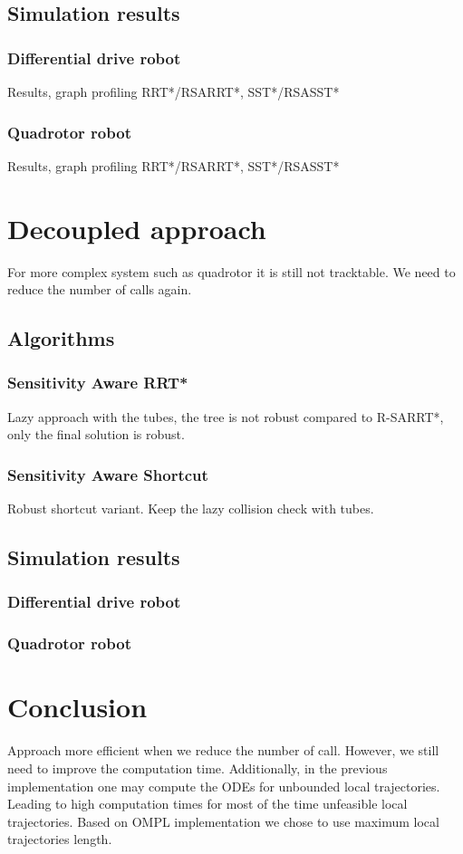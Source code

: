 \subsection{Simulation results}
\subsubsection{Differential drive robot}
Results, graph profiling RRT*/RSARRT*, SST*/RSASST*
\subsubsection{Quadrotor robot}
Results, graph profiling RRT*/RSARRT*, SST*/RSASST*

\section{Decoupled approach}
For more complex system such as quadrotor it is still not tracktable. We need to reduce the number of calls again.
\subsection{Algorithms}
\subsubsection{Sensitivity Aware RRT*}
Lazy approach with the tubes, the tree is not robust compared to R-SARRT*, only the final solution is robust.
\subsubsection{Sensitivity Aware Shortcut}
Robust shortcut variant.
Keep the lazy collision check with tubes.

\subsection{Simulation results}
\subsubsection{Differential drive robot}
\subsubsection{Quadrotor robot}

\section{Conclusion}
Approach more efficient when we reduce the number of call. 
However, we still need to improve the computation time.
Additionally, in the previous implementation one may compute the ODEs for unbounded local trajectories. 
Leading to high computation times for most of the time unfeasible local trajectories. Based on OMPL implementation we chose to use maximum local trajectories length.

\todomarker{}